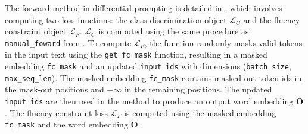 The forward method in differential prompting is detailed in , which involves computing two loss functions: the class discrimination object $\mathcal{L}_C$ and the fluency constraint object $\mathcal{L}_F$. $\mathcal{L}_C$ is computed using the same procedure as \texttt{manual\_foward} from . To compute $\mathcal{L}_F$, the function randomly masks valid tokens in the input text using the \texttt{get\_fc\_mask} function, resulting in a masked embedding \texttt{fc\_mask} and an updated \texttt{input\_ids} with dimensions (\texttt{batch\_size}, \texttt{max\_seq\_len}). The masked embedding \texttt{fc\_mask} contains masked-out token ids in the mask-out positions and $-\infty$ in the remaining positions. The updated \texttt{input\_ids} are then used in the  method to produce an output word embedding $\mathbf{O}$. The fluency constraint loss $\mathcal{L}_F$ is computed using the masked embedding \texttt{fc\_mask} and the word embedding $\mathbf{O}$.

